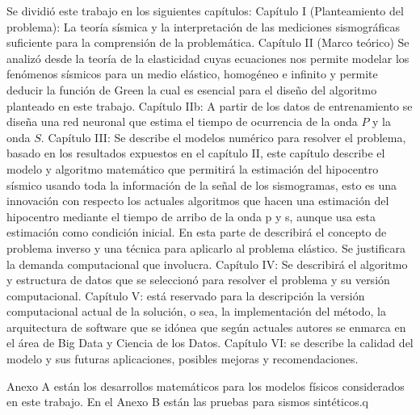 Se dividió este trabajo en los siguientes capítulos:
Capítulo I (Planteamiento del problema): La teoría sísmica y la interpretación
de las mediciones sismográficas suficiente para la comprensión de la
problemática.
Capítulo II (Marco teórico) Se analizó desde la teoría de la elasticidad cuyas
ecuaciones nos permite modelar los fenómenos sísmicos para un medio elástico,
homogéneo e infinito y permite deducir la función de Green la cual es esencial
para el diseño del algoritmo planteado en este trabajo.
Capítulo IIb: A partir de los datos de entrenamiento se diseña una red neuronal
que estima el tiempo de ocurrencia de la onda $P$ y la onda $S$.
Capítulo III: Se describe el modelos numérico para resolver el problema, basado
en los resultados expuestos en el capítulo II, este capítulo describe el modelo
y algoritmo matemático que permitirá la estimación del hipocentro sísmico usando
toda la información de la señal de los sismogramas, esto es una innovación con
respecto los actuales algoritmos que hacen una estimación del hipocentro
mediante el tiempo de arribo de la onda p y s, aunque usa esta estimación como
condición inicial. En esta parte de describirá el concepto de problema inverso y
una técnica para aplicarlo al problema elástico. Se justificara la demanda
computacional que involucra.
Capítulo IV: Se describirá el algoritmo y estructura de datos que se seleccionó
para resolver el problema y su versión computacional.
Capítulo V: está reservado para la descripción la versión computacional actual
de la solución, o sea, la implementación del método, la arquitectura de software
que se idónea que  según actuales autores se enmarca en el área de Big Data y
Ciencia de los Datos.
Capítulo VI: se describe la calidad del modelo y sus futuras aplicaciones,
posibles mejoras y recomendaciones.

Anexo A están los desarrollos matemáticos para los modelos físicos considerados
en este trabajo. En el Anexo B están las pruebas para sismos sintéticos.q

\begin{figure}
\centering
{}
\end{figure}



